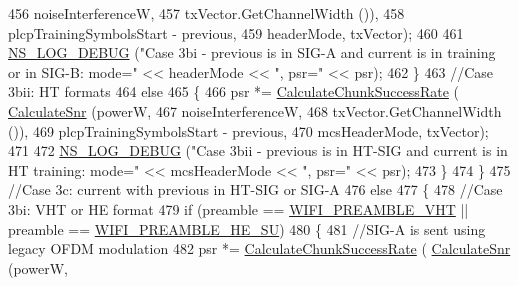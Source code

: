 \begin{DoxyCode}
456                                                                   noiseInterferenceW,
457                                                                   txVector.GetChannelWidth ()),
458                                                     plcpTrainingSymbolsStart - previous,
459                                                     headerMode, txVector);
460 
461                   \hyperlink{group__logging_ga413f1886406d49f59a6a0a89b77b4d0a}{NS\_LOG\_DEBUG} (\textcolor{stringliteral}{"Case 3bi - previous is in SIG-A and current is in training or
       in SIG-B: mode="} << headerMode << \textcolor{stringliteral}{", psr="} << psr);
462                 \}
463               \textcolor{comment}{//Case 3bii: HT formats}
464               \textcolor{keywordflow}{else}
465                 \{
466                   psr *= \hyperlink{classns3_1_1InterferenceHelper_ab1c34c3f7ecef1e37ec778c0cf0e9cef}{CalculateChunkSuccessRate} (
      \hyperlink{classns3_1_1InterferenceHelper_a8f6192d041874595004c007c5a519b4b}{CalculateSnr} (powerW,
467                                                                   noiseInterferenceW,
468                                                                   txVector.GetChannelWidth ()),
469                                                     plcpTrainingSymbolsStart - previous,
470                                                     mcsHeaderMode, txVector);
471 
472                   \hyperlink{group__logging_ga413f1886406d49f59a6a0a89b77b4d0a}{NS\_LOG\_DEBUG} (\textcolor{stringliteral}{"Case 3bii - previous is in HT-SIG and current is in HT
       training: mode="} << mcsHeaderMode << \textcolor{stringliteral}{", psr="} << psr);
473                 \}
474             \}
475           \textcolor{comment}{//Case 3c: current with previous in HT-SIG or SIG-A}
476           \textcolor{keywordflow}{else}
477             \{
478               \textcolor{comment}{//Case 3bi: VHT or HE format}
479               \textcolor{keywordflow}{if} (preamble == \hyperlink{group__wifi_gga5e94a56cb338a14ffbbb19c6a41251ebab90b0fe0b17f27e51c0fe16239e7b089}{WIFI\_PREAMBLE\_VHT} || preamble == 
      \hyperlink{group__wifi_gga5e94a56cb338a14ffbbb19c6a41251eba99c3e12c6e91fc9a9bee491d20dab807}{WIFI\_PREAMBLE\_HE\_SU})
480                 \{
481                   \textcolor{comment}{//SIG-A is sent using legacy OFDM modulation}
482                   psr *= \hyperlink{classns3_1_1InterferenceHelper_ab1c34c3f7ecef1e37ec778c0cf0e9cef}{CalculateChunkSuccessRate} (
      \hyperlink{classns3_1_1InterferenceHelper_a8f6192d041874595004c007c5a519b4b}{CalculateSnr} (powerW,

\end{DoxyCode}
